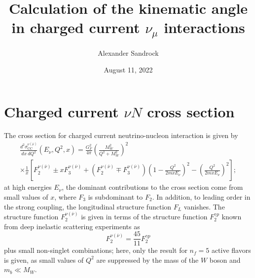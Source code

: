 \documentclass[a4paper]{article}
\begin{document}

\title{Calculation of the kinematic angle in charged current $\nu_\mu$
  interactions}
\author{Alexander Sandrock}
\date{August 11, 2022}
\maketitle

\section{Charged current $\nu N$ cross section}
The cross section for charged current neutrino-nucleon interaction is given by 
\citep{block2013b}
\begin{multline}
  \frac{d^2\sigma_\text{CC}^{\nu (\overline \nu)}}{dx\ dQ^2} (E_\nu, Q^2, x)
    = \frac{G_F^2}{4 \pi} \left(\frac{M_W^2}{Q^2 + M_W^2}\right)^2 \\
  \times \frac{1}{x} \left[ F_2^{\nu (\overline \nu)}
    \pm x F_3^{\nu (\overline \nu)} + (F_2^{\nu (\overline \nu)} \mp
    F_3^{\nu (\overline \nu)}) \left(1 - \frac{Q^2}{2 m x E_\nu}\right)^2
    - \left(\frac{Q^2}{2 m x E_\nu}\right)^2 \right];
\end{multline}
at high energies $E_\nu$, the dominant contributions to the cross section come
from small values of $x$, where $F_3$ is subdominant to $F_2$. In addition, to
leading order in the strong coupling, the longitudinal structure function $F_L$
vanishes. The structure function $F_2^{\nu (\overline{\nu})}$ is given in terms
of the structure function $F_2^{\gamma p}$ known from deep inelastic scattering
experiments as \citep{block2013a,block2013b}
\begin{equation}
  F_2^{\nu (\overline \nu)} = \frac{45}{11} F_2^{\gamma p}
\end{equation}
plus small non-singlet combinations; here, only the result for $n_f = 5$ active
flavors is given, as small values of $Q^2$ are suppressed by the mass of the $W$
boson and $m_b \ll M_W$.
\end{document}
